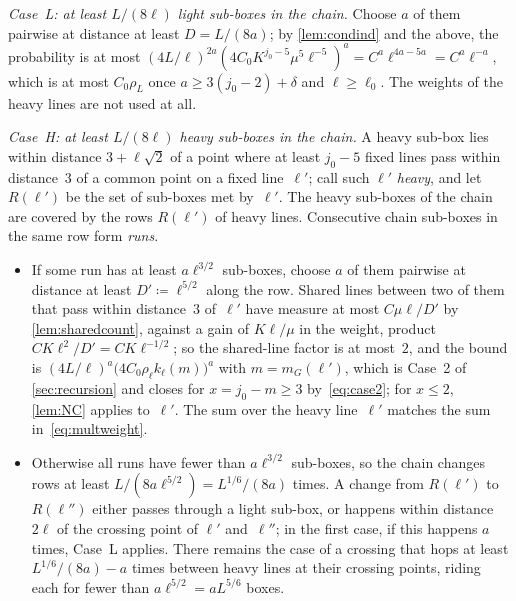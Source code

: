 \documentclass[11pt,letterpaper]{article}
\begin{document}
\emph{Case~L: at least $L/(8\ell)$ light sub-boxes in the chain.} Choose $a$ of them pairwise at distance at least $D=L/(8a)$; by \cref{lem:condind} and the above, the probability is at most $(4L/\ell)^{2a}(4C_0K^{j_0-5}\mu^5\ell^{-5})^a=C^a\ell^{4a-5a}=C^a\ell^{-a}$, which is at most $C_0\rho_L$ once $a\ge3(j_0-2)+\delta$ and $\ell\ge\ell_0$. The weights of the heavy lines are not used at all.

\emph{Case~H: at least $L/(8\ell)$ heavy sub-boxes in the chain.} A heavy sub-box lies within distance $3+\ell\sqrt2$ of a point where at least $j_0-5$ fixed lines pass within distance~$3$ of a common point on a fixed line~$\ell'$; call such $\ell'$ \emph{heavy}, and let $R(\ell')$ be the set of sub-boxes met by~$\ell'$. The heavy sub-boxes of the chain are covered by the rows $R(\ell')$ of heavy lines. Consecutive chain sub-boxes in the same row form \emph{runs}.
\begin{itemize}
  \item If some run has at least $a\ell^{3/2}$ sub-boxes, choose $a$ of them pairwise at distance at least $D'\coloneqq\ell^{5/2}$ along the row. Shared lines between two of them that pass within distance~$3$ of~$\ell'$ have measure at most $C\mu\ell/D'$ by \cref{lem:sharedcount}, against a gain of $K\ell/\mu$ in the weight, product $CK\ell^2/D'=CK\ell^{-1/2}$; so the shared-line factor is at most~$2$, and the bound is $(4L/\ell)^a\bigl(4C_0\rho_\ell k_\ell(m)\bigr)^a$ with $m=m_G(\ell')$, which is Case~2 of \cref{sec:recursion} and closes for $x=j_0-m\ge3$ by~\eqref{eq:case2}; for $x\le2$, \cref{lem:NC} applies to~$\ell'$. The sum over the heavy line~$\ell'$ matches the sum in~\eqref{eq:multweight}.
  \item Otherwise all runs have fewer than $a\ell^{3/2}$ sub-boxes, so the chain changes rows at least $L/(8a\ell^{5/2})=L^{1/6}/(8a)$ times. A change from $R(\ell')$ to $R(\ell'')$ either passes through a light sub-box, or happens within distance $2\ell$ of the crossing point of $\ell'$ and~$\ell''$; in the first case, if this happens $a$ times, Case~L applies. There remains the case of a crossing that hops at least $L^{1/6}/(8a)-a$ times between heavy lines at their crossing points, riding each for fewer than $a\ell^{5/2}=aL^{5/6}$ boxes.
\end{itemize}
\end{document}
